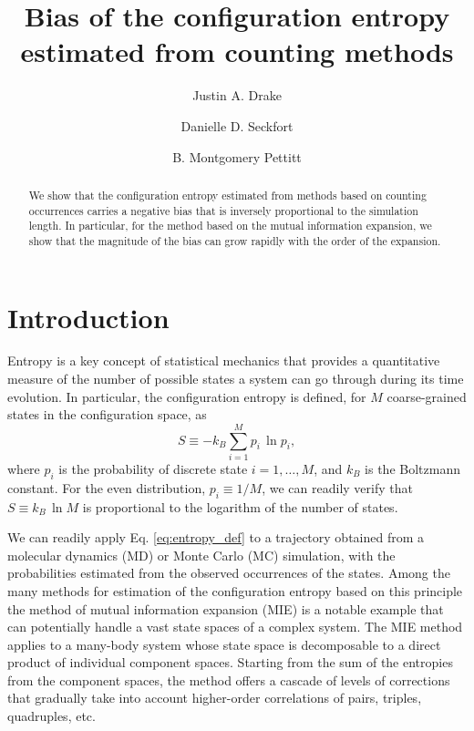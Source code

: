 \documentclass[reprint, superscriptaddress]{revtex4-1}
\begin{document}
\title{Bias of the configuration entropy estimated from counting methods}

\author{Justin A. Drake}
\author{Danielle D. Seckfort}
\author{B. Montgomery Pettitt}

\begin{abstract}
We show that the configuration entropy estimated from methods based on counting occurrences
carries a negative bias
that is inversely proportional to the simulation length.
%
In particular, for the method based on the mutual information expansion,
we show that the magnitude of the bias can grow rapidly with the order of the expansion.
\end{abstract}

\maketitle


\section{Introduction}

Entropy is a key concept of statistical mechanics that provides a quantitative measure of
the number of possible states a system can go through during its time evolution.
%
In particular, the configuration entropy is defined,
for $M$ coarse-grained states in the configuration space, as
%
\begin{equation}
  S
  \equiv
  -k_B \sum_{i = 1}^M p_i \, \ln p_i
  ,
  \label{eq:entropy_def}
\end{equation}
%
where $p_i$ is the probability of discrete state $i = 1, \dots, M$,
and $k_B$ is the Boltzmann constant.
%
For the even distribution, $p_i \equiv 1/M$,
we can readily verify that $S \equiv k_B \, \ln M$
is proportional to the logarithm of the number of states.

We can readily apply Eq. \eqref{eq:entropy_def} to a trajectory
obtained from a molecular dynamics (MD) or Monte Carlo (MC) simulation,
with the probabilities estimated from the observed occurrences of the states.
%
Among the many methods for estimation of the configuration entropy based on this principle
the method of mutual information expansion (MIE) is a notable example
that can potentially handle a vast state spaces of a complex system.
%
The MIE method applies to a many-body system
 whose state space is decomposable to a direct product of individual component spaces.
%
Starting from the sum of the entropies from the component spaces,
the method offers a cascade of levels of corrections
that gradually take into account higher-order correlations
of pairs, triples, quadruples, etc.
\end{document}
